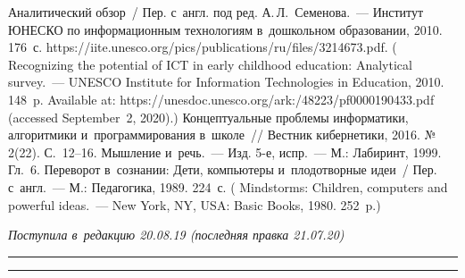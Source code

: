 \begin{multicols}{2}
{{\begin{thebibliography}{9}
\columnbreak

\noindent
 Аналитический обзор~/ Пер. с~англ. под ред. 
А.\,Л.~Семенова.~--- Институт ЮНЕСКО по информационным технологиям 
в~дошкольном образовании, 2010. 176~с. {\sf 
https://iite.unesco.org/pics/publications/ru/files/\linebreak 3214673.pdf}.
( 
Recognizing the potential of ICT in early childhood education: Analytical survey.~---
UNESCO Institute for Information Technologies in Education, 2010. 148~p. 
Available at: {\sf 
https://unesdoc.\linebreak unesco.org/ark:/48223/pf0000190433.pdf} 
(accessed September~2, 2020).)
 Концептуальные проблемы информатики, алгоритмики и~программирования 
в~школе~// Вестник кибернетики, 2016. №\,2(22). С.~12--16.
 Мышление и~речь.~--- Изд. 5-е, испр.~--- М.: Лабиринт, 1999. Гл.~6. 
 Переворот в~сознании: Дети, компьютеры и~плодотворные идеи~/ Пер. 
с~англ.~--- М.: Педагогика, 1989. 224~с.
( Mindstorms: Children, computers and powerful ideas.~---  New York, NY, USA: Basic Books, 
1980. 252~p.)
\end{thebibliography}

 }
 }

\end{multicols}

\vspace*{-3pt}

\hfill{\small\textit{Поступила в~редакцию 20.08.19 (последняя правка 21.07.20)}}

\vspace*{10pt}




\hrule

\vspace*{2pt}

\hrule

\vspace*{2pt}

\def\tit{BASIC CONCEPTS OF~PROGRAMMING EXPOUNDED FOR~PRESCHOOLERS}


\def\titkol{Basic concepts of~programming expounded for~preschoolers}

\def\aut{V.\,B.~Betelin$^1$, A.\,G.~Kushnirenko$^1$, and~A.\,G.~Leonov$^{1,2,3}$}

